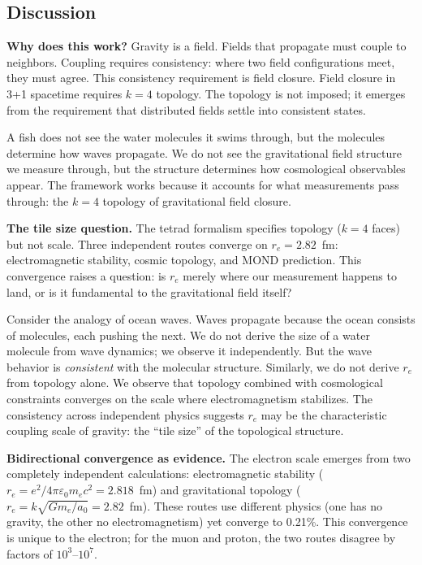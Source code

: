 \documentclass[aps,prd,preprint,superscriptaddress,showpacs,preprintnumbers,amsmath,amssymb,nofootinbib]{revtex4-2}
\begin{document}
\subsection{Discussion}
\label{subsec:discussion}

\textbf{Why does this work?} Gravity is a field. Fields that propagate must couple to neighbors. Coupling requires consistency: where two field configurations meet, they must agree. This consistency requirement is field closure. Field closure in 3+1 spacetime requires $k=4$ topology. The topology is not imposed; it emerges from the requirement that distributed fields settle into consistent states.

A fish does not see the water molecules it swims through, but the molecules determine how waves propagate. We do not see the gravitational field structure we measure through, but the structure determines how cosmological observables appear. The framework works because it accounts for what measurements pass through: the $k=4$ topology of gravitational field closure.

\textbf{The tile size question.} The tetrad formalism specifies topology ($k=4$ faces) but not scale. Three independent routes converge on $r_e = 2.82$~fm: electromagnetic stability, cosmic topology, and MOND prediction. This convergence raises a question: is $r_e$ merely where our measurement happens to land, or is it fundamental to the gravitational field itself?

Consider the analogy of ocean waves. Waves propagate because the ocean consists of molecules, each pushing the next. We do not derive the size of a water molecule from wave dynamics; we observe it independently. But the wave behavior is \emph{consistent} with the molecular structure. Similarly, we do not derive $r_e$ from topology alone. We observe that topology combined with cosmological constraints converges on the scale where electromagnetism stabilizes. The consistency across independent physics suggests $r_e$ may be the characteristic coupling scale of gravity: the ``tile size'' of the topological structure.

\textbf{Bidirectional convergence as evidence.} The electron scale emerges from two completely independent calculations: electromagnetic stability ($r_e = e^2/4\pi\varepsilon_0 m_e c^2 = 2.818$~fm) and gravitational topology ($r_e = k\sqrt{Gm_e/a_0} = 2.82$~fm). These routes use different physics (one has no gravity, the other no electromagnetism) yet converge to 0.21\%. This convergence is unique to the electron; for the muon and proton, the two routes disagree by factors of $10^3$--$10^7$.
\end{document}
